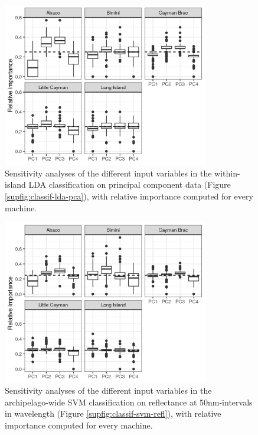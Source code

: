 \begin{figure}[H]
	\centering
	\includegraphics[width=0.8\textwidth]{"../analyses/04-machine learning/plots/importance_lda_pca"}
	\caption{Sensitivity analyses of the different input variables in the within-island LDA classification on principal component data (Figure \ref{supfig:classif-lda-pca}), with relative importance computed for every machine.}
	\label{supfig:importance-lda-pca}
\end{figure}

\begin{figure}[H]
	\centering
	\includegraphics[width=0.8\textwidth]{"../analyses/04-machine learning/plots/importance_svm_pca"}
	\caption{Sensitivity analyses of the different input variables in the archipelago-wide SVM classification on reflectance at 50nm-intervals in wavelength (Figure \ref{supfig:classif-svm-refl}), with relative importance computed for every machine.}
	\label{supfig:importance-svm-refl}
\end{figure}

